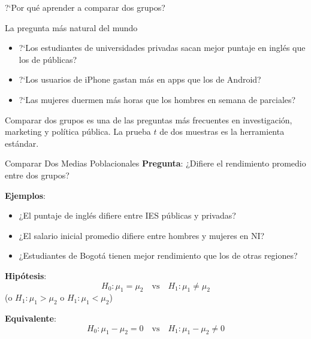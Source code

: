 \documentclass[aspectratio=169, 11pt]{beamer}
\begin{document}
\begin{frame}{?`Por qu\'e aprender a comparar dos grupos?}
\small
\begin{exampleblock}{La pregunta m\'as natural del mundo}
\begin{itemize}\setlength{\itemsep}{2pt}
  \item ?`Los estudiantes de universidades privadas sacan mejor puntaje en ingl\'es que los de p\'ublicas?
  \item ?`Los usuarios de iPhone gastan m\'as en apps que los de Android?
  \item ?`Las mujeres duermen m\'as horas que los hombres en semana de parciales?
\end{itemize}
\end{exampleblock}

\vspace{0.2cm}
Comparar dos grupos es una de las preguntas m\'as frecuentes en investigaci\'on, marketing y pol\'itica p\'ublica. La prueba $t$ de dos muestras es la herramienta est\'andar.
\end{frame}

\begin{frame}{Comparar Dos Medias Poblacionales}
\textbf{Pregunta}: ¿Difiere el rendimiento promedio entre dos grupos?

\vspace{0.3cm}
\textbf{Ejemplos}:
\begin{itemize}
  \item ¿El puntaje de inglés difiere entre IES públicas y privadas?
  \item ¿El salario inicial promedio difiere entre hombres y mujeres en NI?
  \item ¿Estudiantes de Bogotá tienen mejor rendimiento que los de otras regiones?
\end{itemize}

\vspace{0.3cm}
\textbf{Hipótesis}:
\[
H_0: \mu_1 = \mu_2 \quad \text{vs} \quad H_1: \mu_1 \neq \mu_2
\]
(o $H_1: \mu_1 > \mu_2$ o $H_1: \mu_1 < \mu_2$)

\vspace{0.3cm}
\textbf{Equivalente}:
\[
H_0: \mu_1 - \mu_2 = 0 \quad \text{vs} \quad H_1: \mu_1 - \mu_2 \neq 0
\]
\end{frame}
\end{document}
